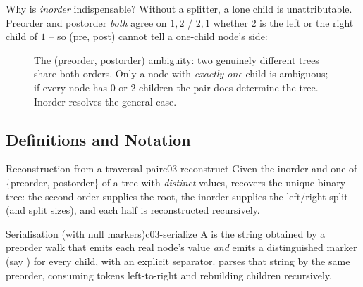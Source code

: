 Why is \emph{inorder} indispensable? Without a splitter, a lone child is unattributable.
Preorder and postorder \emph{both} agree on $1,2$ / $2,1$ whether $2$ is the left or the
right child of $1$ -- so (pre, post) cannot tell a one-child node's side:

\begin{figure}[H]
\centering
{}
\caption{The (preorder, postorder) ambiguity: two genuinely different trees share both
orders. Only a node with \emph{exactly one} child is ambiguous; if every node has $0$ or
$2$ children the pair does determine the tree. Inorder resolves the general case.}\label{fig:c03-ambig}
\end{figure}

\subsection{Definitions and Notation}

\begin{definition}{Reconstruction from a traversal pair}{c03-reconstruct}
Given the inorder and one of \{preorder, postorder\} of a tree with \emph{distinct}
values,  recovers the unique binary tree: the second order supplies
the root, the inorder supplies the left/right split (and split sizes), and each half is
reconstructed recursively.
\end{definition}

\begin{definition}{Serialisation (with null markers)}{c03-serialize}
A  is the string obtained by a preorder walk that emits each real node's
value \emph{and} emits a distinguished marker (say \code{\#}) for every \nil{} child, with
an explicit separator.  parses that string by the same preorder,
consuming tokens left-to-right and rebuilding children recursively.
\end{definition}


